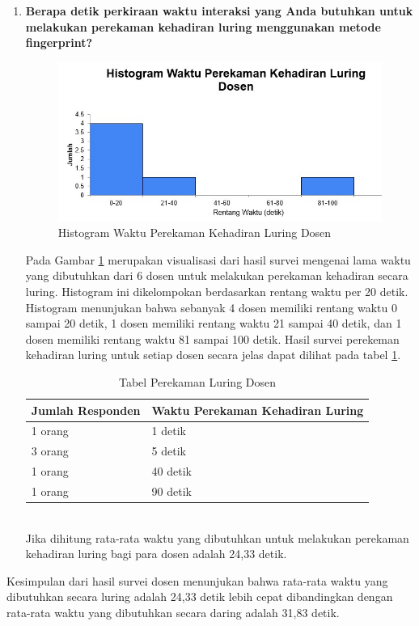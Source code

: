 \begin{enumerate}
	\item \textbf{Berapa detik perkiraan waktu interaksi yang Anda butuhkan untuk melakukan perekaman kehadiran luring menggunakan metode fingerprint?}
	\begin{figure}[H]
		\centering
		\includegraphics[scale=0.8]{Gambar/LuringDosen.jpg}
		\caption{Histogram Waktu Perekaman Kehadiran Luring Dosen} 
		\label{fig:LuringDosen}
	\end{figure}
	Pada Gambar \ref{fig:LuringDosen} merupakan visualisasi dari hasil survei mengenai lama waktu yang dibutuhkan dari 6 dosen untuk melakukan perekaman kehadiran secara luring. Histogram ini dikelompokan berdasarkan rentang waktu per 20 detik. Histogram menunjukan bahwa sebanyak 4 dosen memiliki rentang waktu 0 sampai 20 detik, 1 dosen memiliki rentang waktu 21 sampai 40 detik, dan 1 dosen memiliki rentang waktu 81 sampai 100 detik. Hasil survei perekeman kehadiran luring untuk setiap dosen secara jelas dapat dilihat pada tabel \ref{tab:luringDosen}.	
	\begin{table}[ht]			
		\caption{Tabel Perekaman Luring Dosen}
		\centering
		\begin{tabular}{|p{4cm} |p{7cm}|}
			\hline
			Jumlah Responden &  Waktu Perekaman Kehadiran Luring \\ \hline     
			1 orang &  1 detik\\ \hline 
			3 orang &  5 detik\\ \hline 
			1 orang &  40 detik\\ \hline 
			1 orang &  90 detik\\ \hline 
		\end{tabular}
		\label{tab:luringDosen}
	\end{table}\\
	Jika dihitung rata-rata waktu yang dibutuhkan untuk melakukan perekaman kehadiran luring bagi para dosen adalah 24,33 detik.
\end{enumerate}
Kesimpulan dari hasil survei dosen menunjukan bahwa rata-rata waktu yang dibutuhkan secara luring adalah 24,33 detik lebih cepat dibandingkan dengan rata-rata waktu yang dibutuhkan secara daring adalah 31,83 detik.

